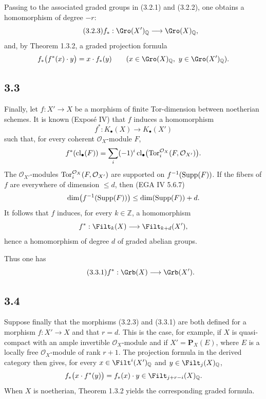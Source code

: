 Passing to the associated graded groups in (3.2.1) and (3.2.2), one obtains a
homomorphism of degree $-r$:
\begin{equation}\tag{3.2.3}
f_*:\Gro(X')_{\mathbb Q}\longrightarrow\Gro(X)_{\mathbb Q},
\end{equation}
and, by Theorem 1.3.2, a graded projection formula
\[
f_*\bigl(f^*(x)\cdot y\bigr)=x\cdot f_*(y)
\qquad(x\in\Gro(X)_{\mathbb Q},\ y\in\Gro(X')_{\mathbb Q}).
\]

\subsection*{3.3}
Finally, let $f:X'\to X$ be a morphism of finite Tor-dimension between
noetherian schemes. It is known (Expos\'e IV) that $f$ induces a homomorphism
\[
f^*:K_\bullet(X)\longrightarrow K_\bullet(X')
\]
such that, for every coherent $\mathcal O_X$-module $F$,
\[
f^*(\operatorname{cl}_\bullet(F))=
\sum_i(-1)^i\operatorname{cl}_\bullet\bigl(
\operatorname{Tor}_i^{\mathcal O_X}(F,\mathcal O_{X'})\bigr).
\]
The $\mathcal O_{X'}$-modules
$\operatorname{Tor}_i^{\mathcal O_X}(F,\mathcal O_{X'})$ are supported on
$f^{-1}(\operatorname{Supp}(F))$. If the fibers of $f$ are everywhere of dimension
$\leq d$, then (EGA IV 5.6.7)
\[
\dim\bigl(f^{-1}(\operatorname{Supp}(F))\bigr)\leq\dim(\operatorname{Supp}(F))+d.
\]
It follows that $f$ induces, for every $k\in\mathbb Z$, a homomorphism
\[
f^*:\Filt_k(X)\longrightarrow\Filt_{k+d}(X'),
\]
hence a homomorphism of degree $d$ of graded abelian groups.

Thus one has
\begin{equation}\tag{3.3.1}
f^*:\Grb(X)\longrightarrow\Grb(X').
\end{equation}

\subsection*{3.4}
Suppose finally that the morphisms (3.2.3) and (3.3.1) are both defined for a
morphism $f:X'\to X$ and that $r=d$. This is the case, for example, if $X$
is quasi-compact with an ample invertible $\mathcal O_X$-module and if
$X'=\mathbf P_X(E)$, where $E$ is a locally free $\mathcal O_X$-module of
rank $r+1$. The projection formula in the derived category then gives, for
every $x\in\Filt^i(X')_{\mathbb Q}$ and $y\in\Filt_j(X)_{\mathbb Q}$,
\[
f_*\bigl(x\cdot f^*(y)\bigr)=f_*(x)\cdot y
\in\Filt_{j+r-i}(X)_{\mathbb Q}.
\]
When $X$ is noetherian, Theorem 1.3.2 yields the corresponding graded formula.

